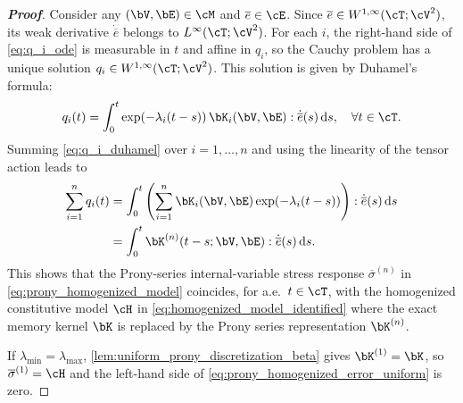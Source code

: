 \begin{proof}[\bf Proof]
Consider any $(\bV,\bE)\in\cM$ and $\overline{e}\in\cE$. Since $\overline{e} \in W^{1,\infty}(\cT; \cV^{2})$, its weak derivative $\dot{\overline{e}}$ belongs to $L^\infty(\cT; \cV^{2})$. For each $i$, the right-hand side of \cref{eq:q_i_ode} is measurable in $t$ and affine in $q_i$, so the Cauchy problem has a unique solution $q_i\in W^{1,\infty}(\cT;\cV^{2})$. This solution is given by Duhamel's formula:
\begin{equation}\label{eq:q_i_duhamel}
q_i(t)=\int_0^t \exp(-\lambda_i(t-s))\,\bK_i(\bV,\bE):\dot{\overline{e}}(s)\,\mathrm{d}s, \quad \forall t \in \cT.
\end{equation}
Summing \cref{eq:q_i_duhamel} over $i=1,\dots,n$ and using the linearity of the tensor action leads to
\begin{align*}
\sum_{i=1}^{n} q_i(t)
&=
\int_0^t \left(\sum_{i=1}^{n}\bK_i(\bV,\bE)\exp(-\lambda_i(t-s))\right):\dot{\overline{e}}(s)\,\mathrm{d}s\\
&=
\int_0^t \bK^{(n)}(t-s;\bV,\bE):\dot{\overline{e}}(s)\,\mathrm{d}s.
\end{align*}
This shows that the Prony-series internal-variable stress response $\overline{\sigma}^{(n)}$ in \cref{eq:prony_homogenized_model} coincides, for a.e.\ $t\in\cT$, with the homogenized constitutive model $\cH$ in \cref{eq:homogenized_model_identified} where the exact memory kernel $\bK$ is replaced by the Prony series representation $\bK^{(n)}$.

If $\lambda_{\min}=\lambda_{\max}$, \cref{lem:uniform_prony_discretization_beta} gives $\bK^{(1)}=\bK$, so $\overline{\sigma}^{(1)}=\cH$ and the left-hand side of \cref{eq:prony_homogenized_error_uniform} is zero.


\end{proof}
